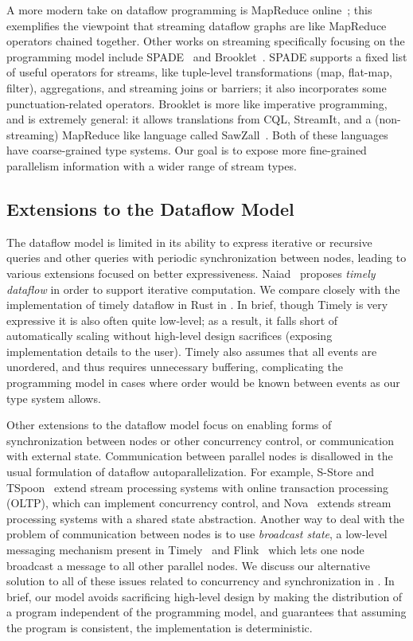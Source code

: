 A more modern take on dataflow programming is MapReduce online~\cite{condie2010mapreduce}; this exemplifies the viewpoint that streaming dataflow graphs are like MapReduce operators chained together.
Other works on streaming specifically focusing on the programming model include SPADE~\cite{gedik2008spade} and Brooklet~\cite{soule2010universal}.
SPADE supports a fixed list of useful operators for streams, like tuple-level transformations (map, flat-map, filter), aggregations, and streaming joins or barriers; it also incorporates some punctuation-related operators.
Brooklet is more like imperative programming,
and is extremely general: it allows translations from CQL, StreamIt, and a (non-streaming) MapReduce like language called SawZall~\cite{pike2005interpreting}.
Both of these languages have coarse-grained type systems.
Our goal is to expose more fine-grained parallelism information with a wider range of stream types.

\subsection{Extensions to the Dataflow Model}

The dataflow model is limited in its ability to express iterative or recursive queries and other queries with periodic synchronization between nodes, leading to various extensions focused on better expressiveness.
Naiad~\cite{Naiad2013,Timely} proposes \emph{timely dataflow} in order
to support iterative computation.
We compare closely with the implementation of timely dataflow in Rust in .
In brief, though Timely is very expressive it is also often quite low-level; as a result, it falls short of automatically scaling without high-level design sacrifices (exposing implementation details to the user).
Timely also assumes that all events are unordered, and thus requires unnecessary buffering, complicating the programming model in cases where order would be known between events as our type system allows.

Other extensions to the dataflow model focus on enabling forms of synchronization between nodes or other concurrency control, or communication with external state.
Communication between parallel nodes is disallowed in the usual formulation of dataflow autoparallelization.
For example, S-Store and TSpoon~\cite{meehan2015s,affetti2020tspoon} extend stream processing systems with online transaction processing (OLTP), which can implement concurrency control,
and Nova~\cite{zhao2021timestamped} extends stream processing systems with a shared state abstraction.
Another way to deal with the problem of communication between nodes
is to use \emph{broadcast state}, a low-level messaging mechanism present in
Timely~\cite{BroadcastStateTimely} and Flink~\cite{BroadcastStateFlink}
which lets one node broadcast a message to all other parallel nodes.
We discuss our alternative solution to all of these issues related to concurrency and synchronization in .
In brief, our model avoids sacrificing high-level design by making the distribution of a program independent of the programming model, and guarantees that assuming the program is consistent, the implementation is deterministic.

